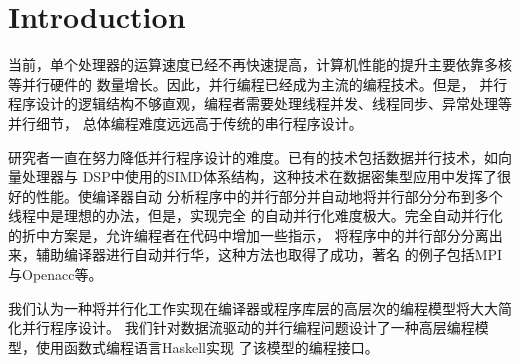 \documentclass[conference]{IEEEtran}
\begin{document}
\section{Introduction}\label{sec:introduction}
当前，单个处理器的运算速度已经不再快速提高，计算机性能的提升主要依靠多核等并行硬件的
数量增长。因此，并行编程已经成为主流的编程技术。但是，
并行程序设计的逻辑结构不够直观，编程者需要处理线程并发、线程同步、异常处理等并行细节，
总体编程难度远远高于传统的串行程序设计。

研究者一直在努力降低并行程序设计的难度。已有的技术包括数据并行技术，如向量处理器与
DSP中使用的SIMD体系结构，这种技术在数据密集型应用中发挥了很好的性能。使编译器自动
分析程序中的并行部分并自动地将并行部分分布到多个线程中是理想的办法，但是，实现完全
的自动并行化难度极大。完全自动并行化的折中方案是，允许编程者在代码中增加一些指示，
将程序中的并行部分分离出来，辅助编译器进行自动并行华，这种方法也取得了成功，著名
的例子包括MPI与Openacc等。

我们认为一种将并行化工作实现在编译器或程序库层的高层次的编程模型将大大简化并行程序设计。
我们针对数据流驱动的并行编程问题设计了一种高层编程模型，使用函数式编程语言Haskell实现
了该模型的编程接口。
\end{document}
